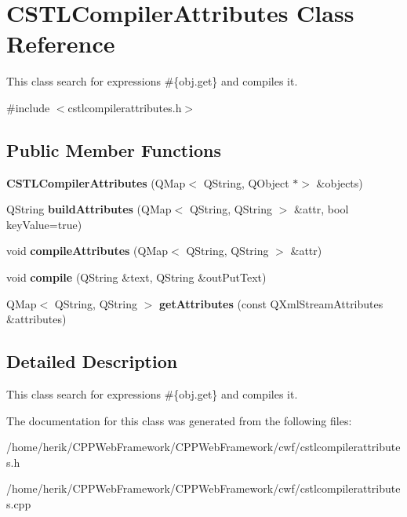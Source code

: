 \hypertarget{class_c_s_t_l_compiler_attributes}{}\section{C\+S\+T\+L\+Compiler\+Attributes Class Reference}
\label{class_c_s_t_l_compiler_attributes}


This class search for expressions \#\{obj.\+get\} and compiles it.  




{\ttfamily \#include $<$cstlcompilerattributes.\+h$>$}

\subsection*{Public Member Functions}
\begin{DoxyCompactItemize}
\item 
\mbox{\label{class_c_s_t_l_compiler_attributes_a1c632f803e86b254d3997a670ab8d185}} 
{\bfseries C\+S\+T\+L\+Compiler\+Attributes} (Q\+Map$<$ Q\+String, Q\+Object $\ast$$>$ \&objects)
\item 
\mbox{\label{class_c_s_t_l_compiler_attributes_a68ca7d9d8ef45dd5f51a0977fb8df911}} 
Q\+String {\bfseries build\+Attributes} (Q\+Map$<$ Q\+String, Q\+String $>$ \&attr, bool key\+Value=true)
\item 
\mbox{\label{class_c_s_t_l_compiler_attributes_a1376447033a4bfcceb1b1d27935d6d06}} 
void {\bfseries compile\+Attributes} (Q\+Map$<$ Q\+String, Q\+String $>$ \&attr)
\item 
\mbox{\label{class_c_s_t_l_compiler_attributes_a63a271e6d97a614a02cd692c8a1f6395}} 
void {\bfseries compile} (Q\+String \&text, Q\+String \&out\+Put\+Text)
\item 
\mbox{\label{class_c_s_t_l_compiler_attributes_aaccef26836cdd8e2c7974b1a1e70b6c0}} 
Q\+Map$<$ Q\+String, Q\+String $>$ {\bfseries get\+Attributes} (const Q\+Xml\+Stream\+Attributes \&attributes)
\end{DoxyCompactItemize}


\subsection{Detailed Description}
This class search for expressions \#\{obj.\+get\} and compiles it. 

The documentation for this class was generated from the following files\+:\begin{DoxyCompactItemize}
\item 
/home/herik/\+C\+P\+P\+Web\+Framework/\+C\+P\+P\+Web\+Framework/cwf/cstlcompilerattributes.\+h\item 
/home/herik/\+C\+P\+P\+Web\+Framework/\+C\+P\+P\+Web\+Framework/cwf/cstlcompilerattributes.\+cpp\end{DoxyCompactItemize}
